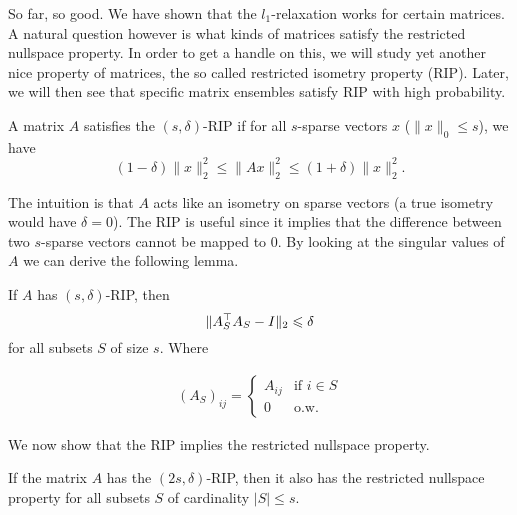 \documentclass[11pt]{article}
\begin{document}
So far, so good. We have shown that the $l_1$-relaxation works for certain matrices. A natural question however is what kinds of matrices satisfy the restricted nullspace property. In order to get a handle on this, we will study yet another nice property of matrices, the so called restricted isometry property (RIP). Later, we will then see that specific matrix ensembles satisfy RIP with high probability.
\begin{definition}
A matrix $A$ satisfies the $(s, \delta)$-RIP if for all $s$-sparse vectors $x$ ($\|x\|_0 \le s$), we have
\[
(1 - \delta)\|x\|_2^2 \le \|Ax\|_2^2 \le (1 + \delta) \|x\|_2^2.
\]
\end{definition}
The intuition is that $A$ acts like an isometry on sparse vectors (a true isometry would have $\delta = 0$). The RIP is useful since it implies that the difference between two $s$-sparse vectors cannot be mapped to $0$. By looking at the singular values of $A$ we can derive the following lemma.
\begin{lemma}
\label{RIPlemma}
If $A$ has $(s, \delta)$-RIP, then
\[
\|A_S^{\top}A_S - I\|_2 \leqslant \delta
\]
for all subsets $S$ of size $s$. Where

\begin{align*}
    (A_S)_{ij} = \begin{cases}
    A_{ij} & \text{if } i \in S \\
    0 & \text{o.w}.
    \end{cases}
\end{align*}
\end{lemma}
We now show that the RIP implies the restricted nullspace property. 
\begin{theorem}
If the matrix $A$ has the $(2s, \delta)$-RIP, then it also has the restricted nullspace property for all subsets $S$ of cardinality $|S| \le s$.
\end{theorem}
\end{document}

